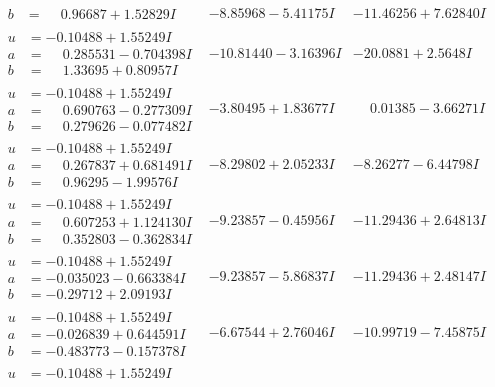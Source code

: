 \documentclass[1p]{elsarticle_modified}
\theoremstyle{definition}
\begin{document}
$$\begin{array}{c|c|c}
\begin{aligned}
b &= \phantom{-}0.96687 + 1.52829 I\end{aligned}
 & -8.85968 - 5.41175 I & -11.46256 + 7.62840 I \\ \hline\begin{aligned}
u &= -0.10488 + 1.55249 I \\
a &= \phantom{-}0.285531 - 0.704398 I \\
b &= \phantom{-}1.33695 + 0.80957 I\end{aligned}
 & -10.81440 - 3.16396 I & -20.0881 + 2.5648 I \\ \hline\begin{aligned}
u &= -0.10488 + 1.55249 I \\
a &= \phantom{-}0.690763 - 0.277309 I \\
b &= \phantom{-}0.279626 - 0.077482 I\end{aligned}
 & -3.80495 + 1.83677 I & \phantom{-}0.01385 - 3.66271 I \\ \hline\begin{aligned}
u &= -0.10488 + 1.55249 I \\
a &= \phantom{-}0.267837 + 0.681491 I \\
b &= \phantom{-}0.96295 - 1.99576 I\end{aligned}
 & -8.29802 + 2.05233 I & -8.26277 - 6.44798 I \\ \hline\begin{aligned}
u &= -0.10488 + 1.55249 I \\
a &= \phantom{-}0.607253 + 1.124130 I \\
b &= \phantom{-}0.352803 - 0.362834 I\end{aligned}
 & -9.23857 - 0.45956 I & -11.29436 + 2.64813 I \\ \hline\begin{aligned}
u &= -0.10488 + 1.55249 I \\
a &= -0.035023 - 0.663384 I \\
b &= -0.29712 + 2.09193 I\end{aligned}
 & -9.23857 - 5.86837 I & -11.29436 + 2.48147 I \\ \hline\begin{aligned}
u &= -0.10488 + 1.55249 I \\
a &= -0.026839 + 0.644591 I \\
b &= -0.483773 - 0.157378 I\end{aligned}
 & -6.67544 + 2.76046 I & -10.99719 - 7.45875 I \\ \hline\begin{aligned}
u &= -0.10488 + 1.55249 I \\

\end{aligned}
\end{array}$$
\end{document}
